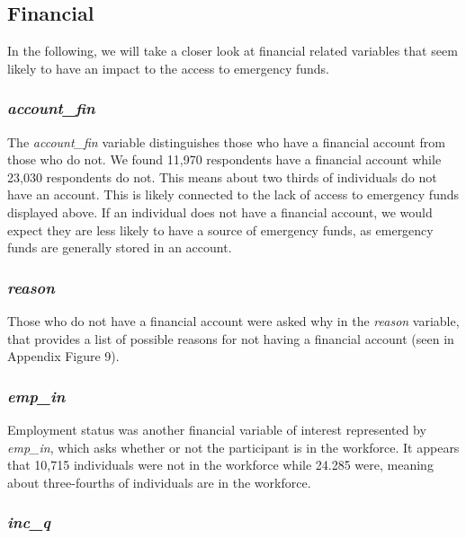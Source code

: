 \documentclass[water,article,submit,moreauthors,pdftex]{mdpi}
\begin{document}
\hypertarget{financial}{%
\subsection{Financial}\label{financial}}

In the following, we will take a closer look at financial related
variables that seem likely to have an impact to the access to emergency
funds.

\hypertarget{account_fin}{%
\subsubsection{\texorpdfstring{\emph{account\_fin}}{account\_fin}}\label{account_fin}}

The \emph{account\_fin} variable distinguishes those who have a
financial account from those who do not. We found 11,970 respondents
have a financial account while 23,030 respondents do not. This means
about two thirds of individuals do not have an account. This is likely
connected to the lack of access to emergency funds displayed above. If
an individual does not have a financial account, we would expect they
are less likely to have a source of emergency funds, as emergency funds
are generally stored in an account.

\hypertarget{reason}{%
\subsubsection{\texorpdfstring{\emph{reason}}{reason}}\label{reason}}

Those who do not have a financial account were asked why in the
\emph{reason} variable, that provides a list of possible reasons for not
having a financial account (seen in Appendix Figure 9).

\hypertarget{emp_in}{%
\subsubsection{\texorpdfstring{\emph{emp\_in}}{emp\_in}}\label{emp_in}}

Employment status was another financial variable of interest represented
by \emph{emp\_in}, which asks whether or not the participant is in the
workforce. It appears that 10,715 individuals were not in the workforce
while 24.285 were, meaning about three-fourths of individuals are in the
workforce.

\hypertarget{inc_q}{%
\subsubsection{\texorpdfstring{\emph{inc\_q}}{inc\_q}}\label{inc_q}}
\end{document}
